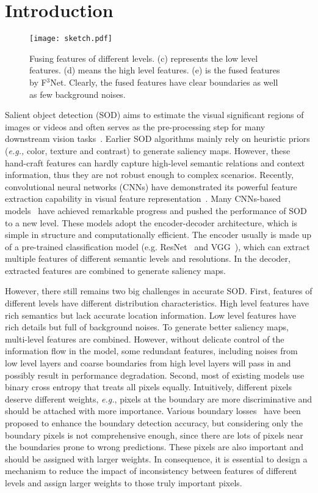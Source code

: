 \documentclass[letterpaper]{article} %
\begin{document}
\section{Introduction}
\begin{figure}[htb]
  \centering
  \texttt{[image: sketch.pdf]}
  \caption{Fusing features of different levels. (c) represents the low level features. (d) means the high level features. (e) is the fused features by F$^3$Net. Clearly, the fused features have clear boundaries as well as few background noises.}
  \label{fusion_feature}
\end{figure}
Salient object detection (SOD) aims to estimate the visual significant regions of images or videos and often serves as the pre-processing step for many downstream vision tasks~\cite{Survey}. Earlier SOD algorithms mainly rely on heuristic priors ({\it e.g.,} color, texture and contrast) to generate saliency maps. However, these hand-craft features can hardly capture high-level semantic relations and context information, thus they are not robust enough to complex scenarios. Recently, convolutional neural networks (CNNs) have demonstrated its powerful feature extraction capability in visual feature representation~\cite{ExFuse,Inception,Densenet,SENet}. Many CNNs-based models~\cite{DSS,BASNet,RAS,CPD,C2SNet,PAGR,AFNet,SRM,Amulet} have achieved remarkable progress and pushed the performance of SOD to a new level. These models adopt the encoder-decoder architecture, which is simple in structure and computationally efficient. The encoder usually is made up of a pre-trained classification model (e.g. ResNet~\cite{Resnet} and VGG~\cite{VGG}), which can extract multiple features of different semantic levels and resolutions. In the decoder, extracted features are combined to generate saliency maps.

However, there still remains two big challenges in accurate SOD. First, features of different levels have different distribution characteristics. High level features have rich semantics but lack accurate location information. Low level features have rich details but full of background noises. To generate better saliency maps, multi-level features are combined. However, without delicate control of the information flow in the model, some redundant features, including noises from low level layers and coarse boundaries from high level layers will pass in and possibly result in performance degradation. Second, most of existing models use binary cross entropy that treats all pixels equally. Intuitively, different pixels deserve different weights, {\it e.g.}, pixels at the boundary are more discriminative and should be attached with more importance. Various boundary losses~\cite{BASNet,AFNet} have been proposed to enhance the boundary detection accuracy, but considering only the boundary pixels is not comprehensive enough, since there are lots of pixels near the boundaries prone to wrong predictions. These pixels are also important and should be assigned with larger weights. In consequence, it is essential to design a mechanism to reduce the impact of inconsistency between features of different levels and assign larger weights to those truly important pixels.
\end{document}
